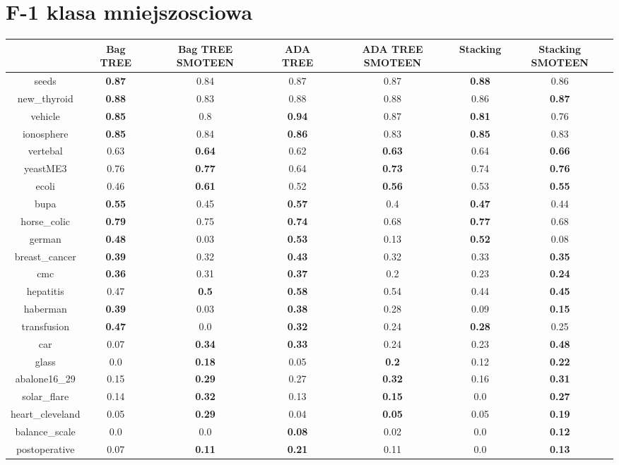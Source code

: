 \documentclass{article}%
\begin{document}
%
\section*{F{-}1 klasa mniejszosciowa}%
\begin{tabular}{c|cccccc}%
&Bag TREE&Bag TREE SMOTEEN&ADA TREE&ADA TREE SMOTEEN&Stacking&Stacking SMOTEEN\\%
\hline%
seeds&\textbf{0.87}&0.84&0.87&0.87&\textbf{0.88}&0.86\\%
new\_thyroid&\textbf{0.88}&0.83&0.88&0.88&0.86&\textbf{0.87}\\%
vehicle&\textbf{0.85}&0.8&\textbf{0.94}&0.87&\textbf{0.81}&0.76\\%
ionosphere&\textbf{0.85}&0.84&\textbf{0.86}&0.83&\textbf{0.85}&0.83\\%
vertebal&0.63&\textbf{0.64}&0.62&\textbf{0.63}&0.64&\textbf{0.66}\\%
yeastME3&0.76&\textbf{0.77}&0.64&\textbf{0.73}&0.74&\textbf{0.76}\\%
ecoli&0.46&\textbf{0.61}&0.52&\textbf{0.56}&0.53&\textbf{0.55}\\%
bupa&\textbf{0.55}&0.45&\textbf{0.57}&0.4&\textbf{0.47}&0.44\\%
horse\_colic&\textbf{0.79}&0.75&\textbf{0.74}&0.68&\textbf{0.77}&0.68\\%
german&\textbf{0.48}&0.03&\textbf{0.53}&0.13&\textbf{0.52}&0.08\\%
breast\_cancer&\textbf{0.39}&0.32&\textbf{0.43}&0.32&0.33&\textbf{0.35}\\%
cmc&\textbf{0.36}&0.31&\textbf{0.37}&0.2&0.23&\textbf{0.24}\\%
hepatitis&0.47&\textbf{0.5}&\textbf{0.58}&0.54&0.44&\textbf{0.45}\\%
haberman&\textbf{0.39}&0.03&\textbf{0.38}&0.28&0.09&\textbf{0.15}\\%
transfusion&\textbf{0.47}&0.0&\textbf{0.32}&0.24&\textbf{0.28}&0.25\\%
car&0.07&\textbf{0.34}&\textbf{0.33}&0.24&0.23&\textbf{0.48}\\%
glass&0.0&\textbf{0.18}&0.05&\textbf{0.2}&0.12&\textbf{0.22}\\%
abalone16\_29&0.15&\textbf{0.29}&0.27&\textbf{0.32}&0.16&\textbf{0.31}\\%
solar\_flare&0.14&\textbf{0.32}&0.13&\textbf{0.15}&0.0&\textbf{0.27}\\%
heart\_cleveland&0.05&\textbf{0.29}&0.04&\textbf{0.05}&0.05&\textbf{0.19}\\%
balance\_scale&0.0&0.0&\textbf{0.08}&0.02&0.0&\textbf{0.12}\\%
postoperative&0.07&\textbf{0.11}&\textbf{0.21}&0.11&0.0&\textbf{0.13}\\%
\end{tabular}
\end{document}
